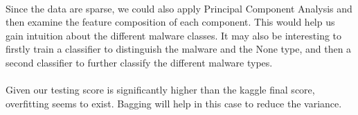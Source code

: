 \documentclass[11pt]{article}
\begin{document}
\paragraph{}Since the data are sparse, we could also apply Principal Component Analysis and then examine the feature composition of each component. This would help us gain intuition about the different malware classes. It may also be interesting to firstly train a classifier to distinguish the malware and the None type, and then a second classifier to further classify the different malware types. 
\paragraph{}Given our testing score is significantly higher than the kaggle final score, overfitting seems to exist. Bagging will help in this case to reduce the variance.
\end{document}
